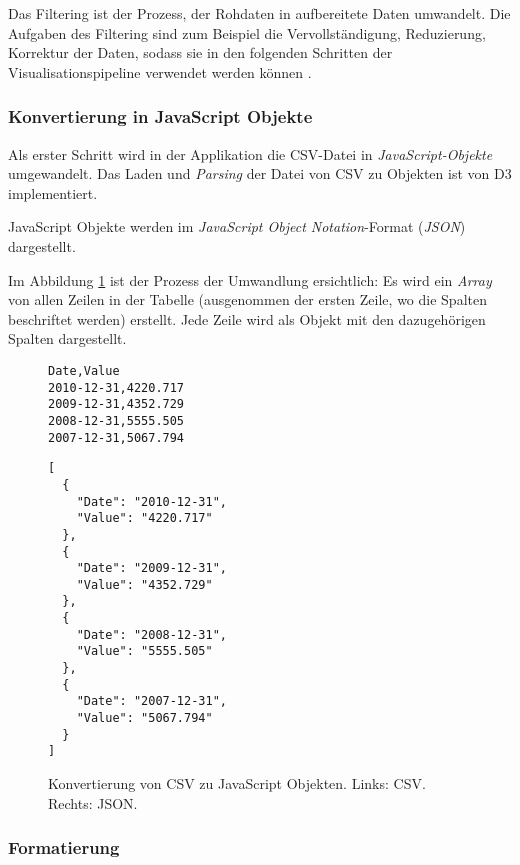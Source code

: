 Das Filtering ist der Prozess, der Rohdaten in aufbereitete Daten umwandelt. Die Aufgaben des Filtering sind zum Beispiel die Vervollständigung, Reduzierung, Korrektur der Daten, sodass sie in den folgenden Schritten der Visualisationspipeline verwendet werden können \cite[Kap. 2]{viz}.

\subsubsection{Konvertierung in JavaScript Objekte}

Als erster Schritt wird in der Applikation die CSV-Datei in \textit{JavaScript-Objekte} umgewandelt. Das Laden und \textit{Parsing} der Datei von CSV zu Objekten ist von D3 implementiert.

JavaScript Objekte werden im \textit{JavaScript Object Notation}-Format (\textit{JSON}) dargestellt.

Im Abbildung \ref{fig:csv-json} ist der Prozess der Umwandlung ersichtlich: Es wird ein \textit{Array} von allen Zeilen in der Tabelle (ausgenommen der ersten Zeile, wo die Spalten beschriftet werden) erstellt. Jede Zeile wird als Objekt mit den dazugehörigen Spalten dargestellt.

\begin{figure}[!htbp]
	\centering
	\begin{minipage}{0.35\textwidth}
		\centering
		\begin{verbatim}
Date,Value
2010-12-31,4220.717
2009-12-31,4352.729
2008-12-31,5555.505
2007-12-31,5067.794
		\end{verbatim}
	\end{minipage}\hfill
	\begin{minipage}{0.55\textwidth}
		\centering

		\begin{verbatim}
[
  {
    "Date": "2010-12-31",
    "Value": "4220.717"
  },
  {
    "Date": "2009-12-31",
    "Value": "4352.729"
  },
  {
    "Date": "2008-12-31",
    "Value": "5555.505"
  },
  {
    "Date": "2007-12-31",
    "Value": "5067.794"
  }
]
		\end{verbatim}
	\end{minipage}
	\caption[CSV und JSON]{Konvertierung von CSV zu JavaScript Objekten. Links: CSV. Rechts: JSON.}
	\label{fig:csv-json}
\end{figure}

\subsubsection{Formatierung}

